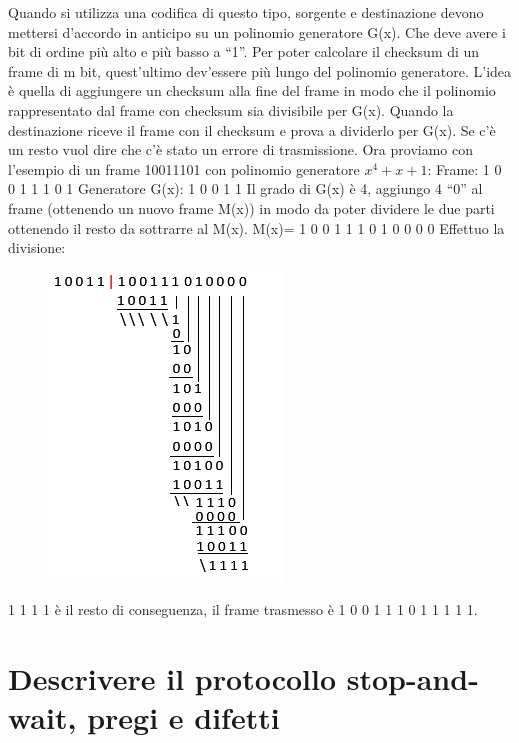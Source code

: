 Quando si utilizza una codifica di questo tipo, sorgente e destinazione devono mettersi d'accordo in anticipo su un polinomio generatore G(x). Che deve avere i bit di ordine più alto e più basso a “1”.
Per poter calcolare il checksum di un frame di m bit, quest'ultimo dev'essere più lungo del polinomio generatore. L'idea è quella di aggiungere un checksum alla fine del frame in modo che il polinomio rappresentato dal frame con checksum sia divisibile per G(x). Quando la destinazione riceve il frame con il checksum e prova a dividerlo per G(x). Se c'è un resto vuol dire che c'è stato un errore di trasmissione.
Ora proviamo con l'esempio di un frame 10011101 con polinomio generatore $x^4+x+1$:
Frame: 1 0 0 1 1 1 0 1 
Generatore G(x): 1 0 0 1 1
Il grado di G(x) è 4, aggiungo 4 “0” al frame (ottenendo un nuovo frame M(x)) in modo da poter dividere le due parti ottenendo il resto da sottrarre al M(x).
M(x)= 1 0 0 1 1 1 0 1 0 0 0 0
Effettuo la divisione: 

\begin{figure}[H]
\centering
\includegraphics[scale=0.65]{res/img/16_DivisioneEsCRC.png}
\end{figure}
             
1 1 1 1 è il resto di conseguenza, il frame trasmesso è 1 0 0 1  1 1 0 1  1 1 1 1.

\section{Descrivere il protocollo stop-and-wait, pregi e difetti}

